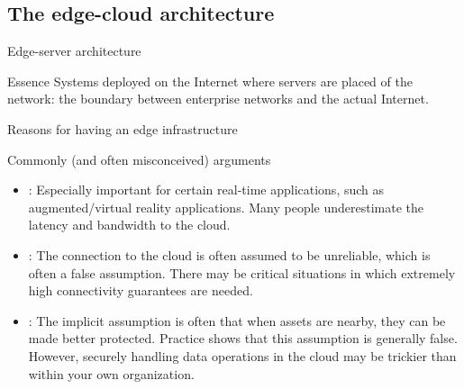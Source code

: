 \subsection{The edge-cloud architecture}
\begin{slide}{Edge-server architecture}
  \begin{block}{Essence}
    Systems deployed on the Internet where servers are placed  of the network:
    the boundary between enterprise networks and the actual Internet.
  \end{block}
  \begin{centerfig}
  \end{centerfig}
\end{slide}
\begin{slide}{Reasons for having an edge infrastructure}
  \begin{block}{Commonly (and often misconceived) arguments}
    \begin{itemize}
    \item {}: Especially important for certain real-time applications, such as
      augmented/virtual reality applications. Many people underestimate the latency and bandwidth to the
      cloud.
    \item {}: The connection to the cloud is often assumed to be unreliable, which is often a
      false assumption. There may be critical situations in which extremely high connectivity guarantees are
      needed.
    \item {}: The implicit assumption is often that when assets are nearby, they can
      be made better protected. Practice shows that this assumption is generally false. However, securely
      handling data operations in the cloud may be trickier than within your own organization.
    \end{itemize}
  \end{block}
\end{slide}

